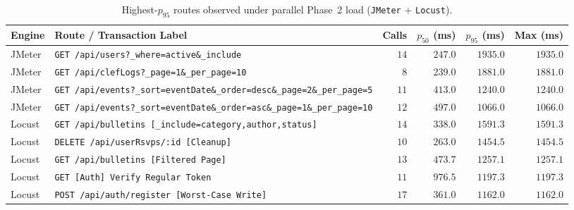 \documentclass[11pt,letterpaper]{article}
\begin{document}
\begin{table}[H]
\centering
\caption{Highest-$p_{95}$ routes observed under parallel Phase~2 load (\texttt{JMeter} + \texttt{Locust}).}
\label{tab:slow_routes}
\small
\begin{tabularx}{\textwidth}{@{}l >{\raggedright\arraybackslash}X r r r r@{}}
\toprule
\textbf{Engine} & \textbf{Route / Transaction Label} & \textbf{Calls} & \textbf{$p_{50}$ (ms)} & \textbf{$p_{95}$ (ms)} & \textbf{Max (ms)} \\
\midrule
JMeter & \texttt{GET /api/users?\_where=active\&\_include} & $14$ & $247.0$ & $1935.0$ & $1935.0$ \\
JMeter & \texttt{GET /api/clefLogs?\_page=1\&\_per\_page=10} & $8$ & $239.0$ & $1881.0$ & $1881.0$ \\
JMeter & \texttt{GET /api/events?\_sort=eventDate\&\allowbreak\_order=desc\&\allowbreak\_page=2\&\allowbreak\_per\_page=5} & $11$ & $413.0$ & $1240.0$ & $1240.0$ \\
JMeter & \texttt{GET /api/events?\_sort=eventDate\&\allowbreak\_order=asc\&\allowbreak\_page=1\&\allowbreak\_per\_page=10} & $12$ & $497.0$ & $1066.0$ & $1066.0$ \\
\midrule
Locust & \texttt{GET /api/bulletins [\_include=category,\allowbreak author,\allowbreak status]} & $14$ & $338.0$ & $1591.3$ & $1591.3$ \\
Locust & \texttt{DELETE /api/userRsvps/:id [Cleanup]} & $10$ & $263.0$ & $1454.5$ & $1454.5$ \\
Locust & \texttt{GET /api/bulletins [Filtered Page]} & $13$ & $473.7$ & $1257.1$ & $1257.1$ \\
Locust & \texttt{GET [Auth] Verify Regular Token} & $11$ & $976.5$ & $1197.3$ & $1197.3$ \\
Locust & \texttt{POST /api/auth/register [Worst-Case Write]} & $17$ & $361.0$ & $1162.0$ & $1162.0$ \\
\bottomrule
\end{tabularx}
\end{table}
\end{document}
